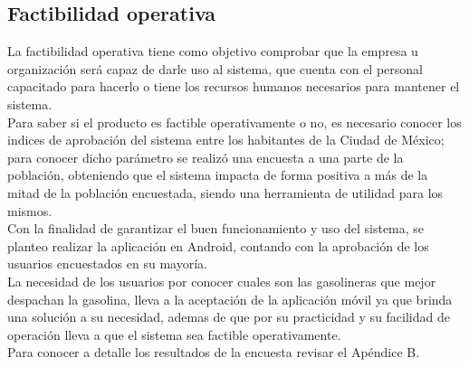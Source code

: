 \subsection{Factibilidad operativa}
La factibilidad operativa tiene como objetivo comprobar que la empresa u organización será capaz de darle uso al sistema, que cuenta con el personal capacitado para hacerlo o tiene los recursos humanos necesarios para mantener el sistema\cite{factOperativa}.
\\
Para saber si el producto es factible operativamente o no, es necesario conocer los indices de aprobación del sistema entre los habitantes de la Ciudad de México; para conocer dicho parámetro se realizó una encuesta a una parte de la población, obteniendo que el sistema impacta de forma positiva a más de la mitad de la población encuestada, siendo una herramienta de utilidad para los mismos.
\\
Con la finalidad de garantizar el buen funcionamiento y uso del sistema, se planteo realizar la aplicación en Android, contando con la aprobación de los usuarios encuestados en su mayoría.
\\
La necesidad de los usuarios por conocer cuales son las gasolineras que mejor despachan la gasolina, lleva a la aceptación de la aplicación móvil ya que brinda una solución a su necesidad, ademas de que por su practicidad y su facilidad de operación lleva a que el sistema sea factible operativamente.
\\
Para conocer a detalle los resultados de la encuesta revisar el Apéndice B.
\begin{comment}
En la Tabla \ref{tabla_factibilidad_operativa}, se muestran los diferentes aspectos analizados para el desarrollo del presente trabajo.

\begin{longtable}{|M{2.5cm}|M{3cm}|M{2cm}|M{2cm}|M{2cm}|M{2cm}|}
		\hline
		\textbf{Personal} & \textbf{Actividades} & \textbf{Salario Mensual} & \textbf{Cantidad de Personas} & \textbf{Tiempo} & \textbf{Salario total por desarrollo} \\ \hline
		Programador Android &
		Desarrollo de la aplicación móvil.
		 & \$8 000 & 1 & 6 meses &  \$48 000 \\\hline
		Administrador de base de datos & Diseño e implementación de la base de datos & \$8 000 & 1 & 6 meses  & \$48 000 \\\hline
		Ing. en sistemas computacionales & 
		\begin{itemize}
			\item Análisis y diseño del servidor web
			\item Desarrollo del hardware del proyecto
		\end{itemize}
		& \$8 000 & 1 & 6 meses & \$48 000 \\ \hline
		\multicolumn{5}{|r|}{Total} & \$144 000 \\ \hline
	\caption{Factibilidad operativa}
	\label{tabla_factibilidad_operativa} 
\end{longtable}
\end{comment}